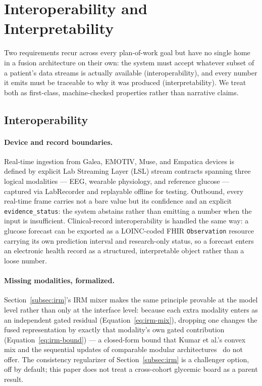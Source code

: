\section{Interoperability and Interpretability}
\label{sec:interop-interpret}
Two requirements recur across every plan-of-work goal but have no single home in a fusion
architecture on their own: the system must accept whatever subset of a patient's data streams is
actually available (interoperability), and every number it emits must be traceable to why it was
produced (interpretability). We treat both as first-class, machine-checked properties rather than
narrative claims.

\subsection{Interoperability}
\label{subsec:interop}
\paragraph{Device and record boundaries.} Real-time ingestion from Galea, EMOTIV, Muse, and
Empatica devices is defined by explicit Lab Streaming Layer (LSL) stream contracts spanning three
logical modalities --- EEG, wearable physiology, and reference glucose --- captured via
LabRecorder and replayable offline for testing. Outbound, every real-time frame carries not a bare
value but its confidence and an explicit \texttt{evidence\_status}: the system abstains rather than
emitting a number when the input is insufficient. Clinical-record interoperability is handled the
same way: a glucose forecast can be exported as a LOINC-coded FHIR \texttt{Observation} resource
carrying its own prediction interval and research-only status, so a forecast enters an electronic
health record as a structured, interpretable object rather than a loose number.

\paragraph{Missing modalities, formalized.} Section~\ref{subsec:irm}'s IRM mixer makes the same
principle provable at the model level rather than only at the interface level: because each extra
modality enters as an independent gated residual (Equation~\ref{eq:irm-mix}), dropping one changes
the fused representation by exactly that modality's own gated contribution
(Equation~\ref{eq:irm-bound}) --- a closed-form bound that Kumar et al.'s convex mix and the
sequential updates of comparable modular architectures~\cite{multimodn} do not offer. The
consistency regularizer of Section~\ref{subsec:irm} is a challenger option, off by default; this paper does not treat a cross-cohort glycemic board as a parent result.

